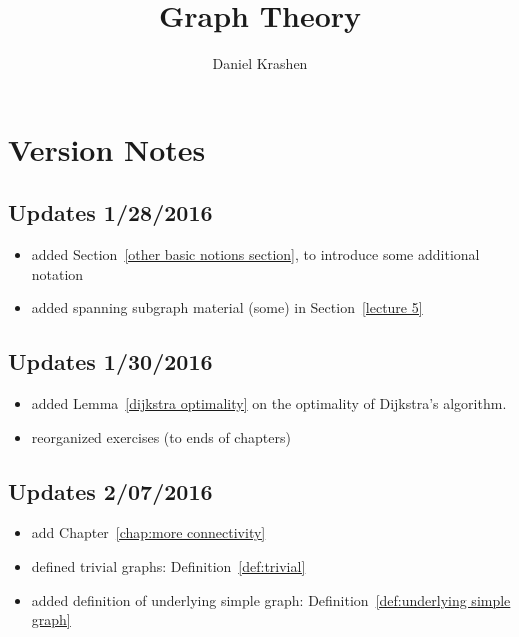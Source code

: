 \documentclass[12pt]{report}
\theoremstyle{plain}
\begin{document}


\author{Daniel Krashen}
\title{Graph Theory}

\maketitle
\tableofcontents


\chapter*{Version Notes}

\section{Updates 1/28/2016}
\begin{itemize}
\item added Section~\ref{other basic notions section}, to introduce some
additional notation
\item added spanning subgraph material (some) in Section~\ref{lecture 5}
\end{itemize}

\section{Updates 1/30/2016}
\begin{itemize}
\item added Lemma~\ref{dijkstra optimality}
on the optimality of Dijkstra's algorithm.
\item reorganized exercises (to ends of chapters)
\end{itemize}

\section{Updates 2/07/2016}
\begin{itemize}
\item add Chapter~\ref{chap:more connectivity}
\item defined trivial graphs: Definition~\ref{def:trivial}
\item added definition of underlying simple graph:
Definition~\ref{def:underlying simple graph}
\end{itemize}
\end{document}
